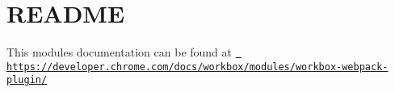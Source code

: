 \chapter{README}
\hypertarget{md_pkiclassroomrescheduler_2src_2main_2frontend_2node__modules_2workbox-webpack-plugin_2_r_e_a_d_m_e}{}\label{md_pkiclassroomrescheduler_2src_2main_2frontend_2node__modules_2workbox-webpack-plugin_2_r_e_a_d_m_e}
This module\textquotesingle{}s documentation can be found at \href{https://developer.chrome.com/docs/workbox/modules/workbox-webpack-plugin/}{\texttt{ https\+://developer.\+chrome.\+com/docs/workbox/modules/workbox-\/webpack-\/plugin/}} 